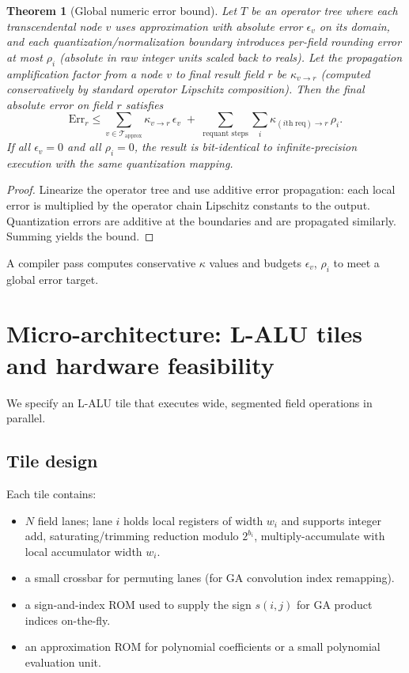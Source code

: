 \documentclass[11pt]{article}
\theoremstyle{definition}
\theoremstyle{plain}
\newtheorem{theorem}{Theorem}[section]
\begin{document}
\begin{theorem}[Global numeric error bound]\label{thm:errorcomp}
Let \(T\) be an operator tree where each transcendental node \(v\) uses approximation with absolute error \(\epsilon_v\) on its domain, and each quantization/normalization boundary introduces per-field rounding error at most \(\rho_i\) (absolute in raw integer units scaled back to reals). Let the propagation amplification factor from a node \(v\) to final result field \(r\) be \(\kappa_{v\to r}\) (computed conservatively by standard operator Lipschitz composition). Then the final absolute error on field \(r\) satisfies
\[
\mathrm{Err}_r \le \sum_{v\in \mathcal{T}_{\mathrm{approx}}} \kappa_{v\to r}\, \epsilon_v \;+\; \sum_{\text{requant steps}} \sum_{i} \kappa_{(i\mathrm{th\;req})\to r}\,\rho_i.
\]
If all \(\epsilon_v = 0\) and all \(\rho_i = 0\), the result is bit-identical to infinite-precision execution with the same quantization mapping.
\end{theorem}

\begin{proof}
Linearize the operator tree and use additive error propagation: each local error is multiplied by the operator chain Lipschitz constants to the output. Quantization errors are additive at the boundaries and are propagated similarly. Summing yields the bound.
\end{proof}

A compiler pass computes conservative \(\kappa\) values and budgets \(\epsilon_v\), \(\rho_i\) to meet a global error target.

\section{Micro-architecture: L-ALU tiles and hardware feasibility}
We specify an L-ALU tile that executes wide, segmented field operations in parallel.

\subsection{Tile design}
Each tile contains:
\begin{itemize}
  \item \(N\) field lanes; lane \(i\) holds local registers of width \(w_i\) and supports integer add, saturating/trimming reduction modulo \(2^{b_i}\), multiply-accumulate with local accumulator width \(w_i\).
  \item a small crossbar for permuting lanes (for GA convolution index remapping).
  \item a sign-and-index ROM used to supply the sign \(s(i,j)\) for GA product indices on-the-fly.
  \item an approximation ROM for polynomial coefficients or a small polynomial evaluation unit.
\end{itemize}
\end{document}
